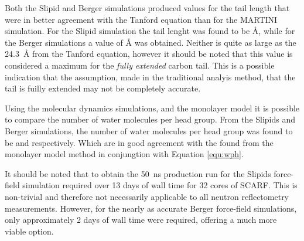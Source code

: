 \documentclass[amsmath,amssymb,twocolumn,superscriptaddress,aps,prl]{revtex4-1}
\begin{document}
Both the Slipid and Berger simulations produced values for the tail length that were in better agreement with the Tanford equation than for the MARTINI simulation.
For the Slipid simulation the tail lenght was found to be \si{\angstrom}, while for the Berger simulations a value of \si{\angstrom} was obtained.
Neither is quite as large as the \SI{24.3}{\angstrom} from the Tanford equation, however it should be noted that this value is considered a maximum for the \emph{fully extended} carbon tail.
This is a possible indication that the assumption, made in the traditional analyis method, that the tail is fuilly extended may not be completely accurate.

Using the molecular dynamics simulations, and the monolayer model it is possible to compare the number of water molecules per head group.
From the Slipids and Berger simulations, the number of water molecules per head group was found to be  and  respectively.
Which are in good agreement with the  found from the monolayer model method in conjungtion with Equation \ref{equ:wph}.

It should be noted that to obtain the \SI{50}{\nano\second} production run for the Slipids force-field simulation required over 13 days of wall time for 32 cores of SCARF.
This is non-trivial and therefore not necessarily applicable to all neutron reflectometry measurements.
However, for the nearly as accurate Berger force-field simulations, only approximately 2 days of wall time were required, offering a much more viable option.
\end{document}
